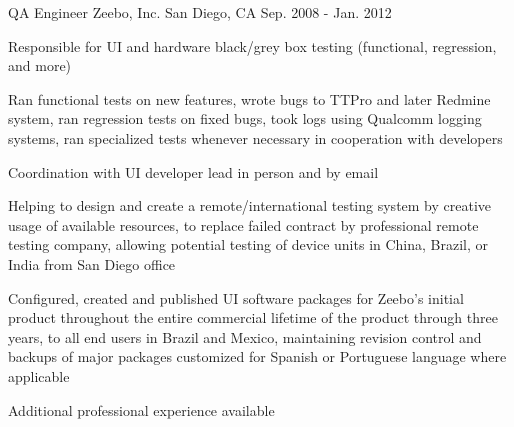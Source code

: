 \begin{cventries}
    \cventry
    {QA Engineer} %
    {Zeebo, Inc.} %
    {San Diego, CA} %
    {Sep. 2008 - Jan. 2012} %
    {
      \begin{cvitems} %
        \item[] {Responsible for UI and hardware black/grey box testing (functional, regression, and more)}
        \item[]
        \item {Ran functional tests on new features, wrote bugs to TTPro and later Redmine system, ran regression tests on fixed bugs, took logs using Qualcomm logging systems, ran specialized tests whenever necessary in cooperation with developers}
        \item {Coordination with UI developer lead in person and by email}
        \item {Helping to design and create a remote/international testing system by creative usage of available resources, to replace failed contract by professional remote testing company, allowing potential testing of device units in China, Brazil, or India from San Diego office}
        \item {Configured, created and published UI software packages for Zeebo's initial product throughout the entire commercial lifetime of the product through three years, to all end users in Brazil and Mexico, maintaining revision control and backups of major packages customized for Spanish or Portuguese language where applicable}
      \end{cvitems}
    }

    Additional professional experience available
\end{cventries}
